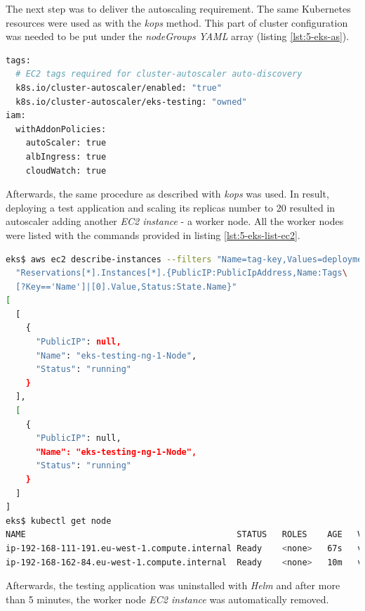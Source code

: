 The next step was to deliver the autoscaling requirement. The same Kubernetes resources were used as with the \textit{kops} method. This part of cluster configuration was needed to be put under the \textit{nodeGroups} \textit{YAML} array (listing \ref{lst:5-eks-as}).
\begin{lstlisting}[basicstyle=\scriptsize,xleftmargin=0cm,label=lst:5-eks-as,caption={\textit{Eksctl} configuration needed for autoscaler},captionpos=b,language=Bash ]
tags:
  # EC2 tags required for cluster-autoscaler auto-discovery
  k8s.io/cluster-autoscaler/enabled: "true"
  k8s.io/cluster-autoscaler/eks-testing: "owned"
iam:
  withAddonPolicies:
    autoScaler: true
    albIngress: true
    cloudWatch: true
\end{lstlisting}

Afterwards, the same procedure as described with \textit{kops} was used. In result, deploying a test application and scaling its replicas number to 20 resulted in autoscaler adding another \textit{EC2 instance} - a worker node. All the worker nodes were listed with the  commands provided in listing \ref{lst:5-eks-list-ec2}.
\begin{lstlisting}[basicstyle=\scriptsize,xleftmargin=0cm,label=lst:5-eks-list-ec2,caption={Listing \textit{EC2 instances}, one was created by autoscaler},captionpos=b,language=Bash]
eks$ aws ec2 describe-instances --filters "Name=tag-key,Values=deployment" --query\
  "Reservations[*].Instances[*].{PublicIP:PublicIpAddress,Name:Tags\
  [?Key=='Name']|[0].Value,Status:State.Name}"
[
  [
    {
      "PublicIP": null,
      "Name": "eks-testing-ng-1-Node",
      "Status": "running"
    }
  ],
  [
    {
      "PublicIP": null,
      "Name": "eks-testing-ng-1-Node",
      "Status": "running"
    }
  ]
]
eks$ kubectl get node
NAME                                          STATUS   ROLES    AGE   VERSION
ip-192-168-111-191.eu-west-1.compute.internal Ready    <none>   67s   v1.16.8-eks-e16311
ip-192-168-162-84.eu-west-1.compute.internal  Ready    <none>   10m   v1.16.8-eks-e16311
\end{lstlisting}
Afterwards, the testing application was uninstalled with \textit{Helm} and after more than 5 minutes, the worker node \textit{EC2 instance} was automatically removed.

